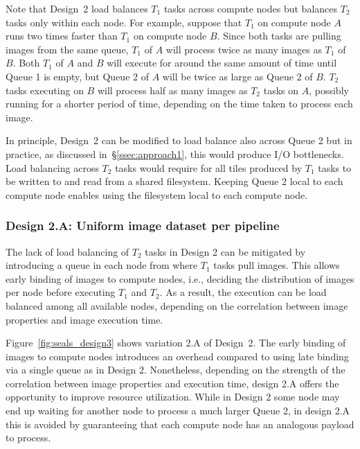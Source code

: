Note that Design~2 load balances $T_{1}$ tasks across compute nodes but  balances $T_{2}$ tasks only within each node.
For example, suppose that $T_{1}$ on compute node $A$ runs two times faster than $T_{1}$ on compute node $B$.
Since both tasks are pulling images from the same queue, $T_{1}$ of $A$ will process twice as many images as $T_{1}$ of $B$.
Both $T_{1}$ of $A$ and $B$ will execute for around the same amount of time until Queue 1 is empty, but Queue 2 of $A$ will be twice as large as Queue 2 of $B$.
$T_{2}$ tasks executing on $B$ will process half as many images as $T_{2}$ tasks on $A$, possibly running for a shorter period of time, depending on the time taken to process each image.

In principle, Design~2 can be modified to load balance also across Queue 2 but in practice, as discussed in~\S\ref{ssec:approach1}, this would produce I/O bottlenecks.
Load balancing across $T_{2}$ tasks would require for all tiles produced by $T_{1}$ tasks to be written to and read  from a  shared filesystem.
Keeping Queue 2 local to each compute node enables using the filesystem local to each compute node.

\subsubsection{Design 2.A: Uniform image dataset per pipeline}
\label{sssec:approach2a}

The lack of load balancing of $T_{2}$ tasks in Design 2 can be mitigated by introducing a queue in each node from where $T_{1}$ tasks pull images.
This allows early binding of images to compute nodes, i.e., deciding the distribution of images per node before executing $T_{1}$ and $T_{2}$.
As a result, the execution can be load balanced among all available nodes, depending on the correlation between image properties and image execution time.

Figure~\ref{fig:seals_design3} shows variation 2.A of Design~2.
The early binding of images to compute nodes introduces an overhead compared to using late binding via a single queue as in Design 2.
Nonetheless, depending on the strength of the correlation between image properties and execution time, design 2.A offers the opportunity to improve resource utilization.
While in Design 2 some node may end up waiting for another node to process a much larger Queue 2, in design 2.A this is avoided by guaranteeing that each compute node has an analogous payload to process.

